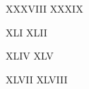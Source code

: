 \documentclass[booklanguage=english]{byrnebook}
\begin{document}
\vspace*{\fill}
\pagebreak

\vspace*{\fill}

%
{XXXVIII}{}%
{XXXIX}{}

\vfill

%
{XLI}{}%
{XLII}{}

\vfill

%
{XLIV}{}%
{XLV}{}

\vfill

%
{XLVII}{}%
{XLVIII}{}

\vspace*{\fill}
\end{document}
